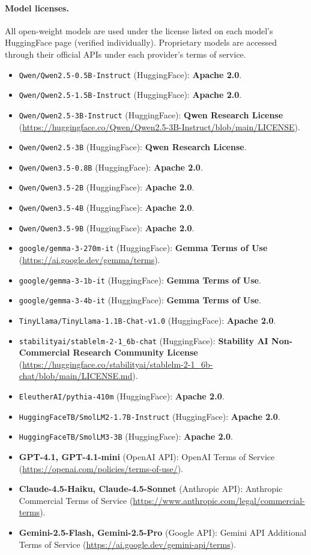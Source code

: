 \documentclass[letterpaper]{article} %
\begin{document}
\paragraph{Model licenses.}
All open-weight models are used under the license listed on each
model's HuggingFace page (verified individually). Proprietary
models are accessed through their official APIs under each
provider's terms of service.

\begin{itemize}\setlength\itemsep{0pt}
\item \texttt{Qwen/Qwen2.5-0.5B-Instruct} (HuggingFace):
  \textbf{Apache 2.0}.
\item \texttt{Qwen/Qwen2.5-1.5B-Instruct} (HuggingFace):
  \textbf{Apache 2.0}.
\item \texttt{Qwen/Qwen2.5-3B-Instruct} (HuggingFace):
  \textbf{Qwen Research License}
  (\url{https://huggingface.co/Qwen/Qwen2.5-3B-Instruct/blob/main/LICENSE}).
\item \texttt{Qwen/Qwen2.5-3B} (HuggingFace):
  \textbf{Qwen Research License}.
\item \texttt{Qwen/Qwen3.5-0.8B} (HuggingFace):
  \textbf{Apache 2.0}.
\item \texttt{Qwen/Qwen3.5-2B} (HuggingFace):
  \textbf{Apache 2.0}.
\item \texttt{Qwen/Qwen3.5-4B} (HuggingFace):
  \textbf{Apache 2.0}.
\item \texttt{Qwen/Qwen3.5-9B} (HuggingFace):
  \textbf{Apache 2.0}.
\item \texttt{google/gemma-3-270m-it} (HuggingFace):
  \textbf{Gemma Terms of Use}
  (\url{https://ai.google.dev/gemma/terms}).
\item \texttt{google/gemma-3-1b-it} (HuggingFace):
  \textbf{Gemma Terms of Use}.
\item \texttt{google/gemma-3-4b-it} (HuggingFace):
  \textbf{Gemma Terms of Use}.
\item \texttt{TinyLlama/TinyLlama-1.1B-Chat-v1.0} (HuggingFace):
  \textbf{Apache 2.0}.
\item \texttt{stabilityai/stablelm-2-1\_6b-chat} (HuggingFace):
  \textbf{Stability AI Non-Commercial Research Community License}
  (\url{https://huggingface.co/stabilityai/stablelm-2-1_6b-chat/blob/main/LICENSE.md}).
\item \texttt{EleutherAI/pythia-410m} (HuggingFace):
  \textbf{Apache 2.0}.
\item \texttt{HuggingFaceTB/SmolLM2-1.7B-Instruct} (HuggingFace):
  \textbf{Apache 2.0}.
\item \texttt{HuggingFaceTB/SmolLM3-3B} (HuggingFace):
  \textbf{Apache 2.0}.
\item \textbf{GPT-4.1, GPT-4.1-mini} (OpenAI API):
  OpenAI Terms of Service
  (\url{https://openai.com/policies/terms-of-use/}).
\item \textbf{Claude-4.5-Haiku, Claude-4.5-Sonnet} (Anthropic API):
  Anthropic Commercial Terms of Service
  (\url{https://www.anthropic.com/legal/commercial-terms}).
\item \textbf{Gemini-2.5-Flash, Gemini-2.5-Pro} (Google API):
  Gemini API Additional Terms of Service
  (\url{https://ai.google.dev/gemini-api/terms}).
\end{itemize}
\end{document}
